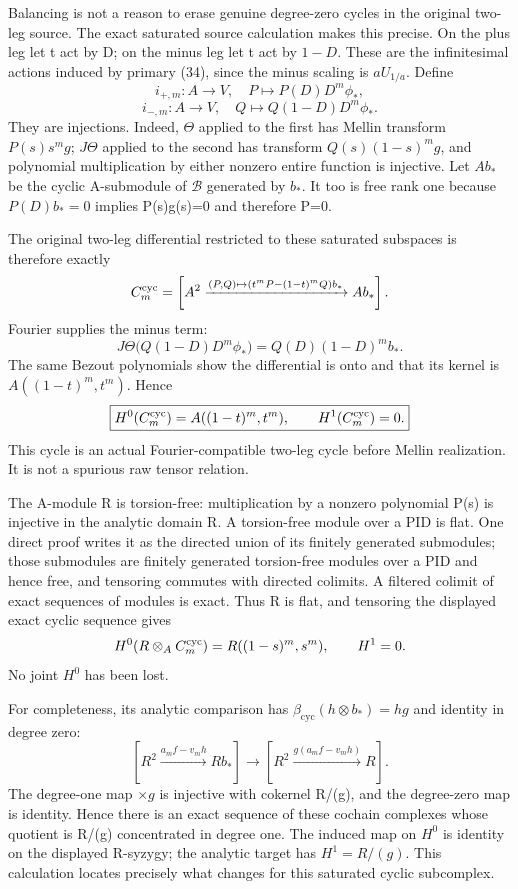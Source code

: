 \documentclass[10pt,a4paper,oneside]{report}
\begin{document}
Balancing is not a reason to erase genuine degree-zero cycles in the original two-leg source. The exact saturated source calculation makes this precise. On the plus leg let t act by D; on the minus leg let t act by \(1-D\). These are the infinitesimal actions induced by primary (34), since the minus scaling is \(aU_{1/a}\). Define \[
i_{+,m}:A\longrightarrow V,\quad
P\longmapsto P(D)D^m\phi_*,
\] \[
i_{-,m}:A\longrightarrow V,\quad
Q\longmapsto Q(1-D)D^m\phi_*.
\] They are injections. Indeed, \(\Theta\) applied to the first has Mellin transform \(P(s)s^mg\); \(J\Theta\) applied to the second has transform \(Q(s)(1-s)^mg\), and polynomial multiplication by either nonzero entire function is injective. Let \(A b_*\) be the cyclic A-submodule of \(\mathscr B\) generated by \(b_*\). It too is free rank one because \(P(D)b_*=0\) implies P(s)g(s)=0 and therefore P=0.

The original two-leg differential restricted to these saturated subspaces is therefore exactly \[
C_m^{\rm cyc}
=\left[A^2\xrightarrow{(P,Q)\mapsto
(t^mP-(1-t)^mQ)b_*}A b_*\right].
\] Fourier supplies the minus term: \[
J\Theta\bigl(Q(1-D)D^m\phi_*\bigr)
=Q(D)(1-D)^m b_*.
\] The same Bezout polynomials show the differential is onto and that its kernel is \(A((1-t)^m,t^m)\). Hence \[
\boxed{H^0(C_m^{\rm cyc})=A((1-t)^m,t^m),\qquad
H^1(C_m^{\rm cyc})=0.}
\] This cycle is an actual Fourier-compatible two-leg cycle before Mellin realization. It is not a spurious raw tensor relation.

The A-module R is torsion-free: multiplication by a nonzero polynomial P(s) is injective in the analytic domain R. A torsion-free module over a PID is flat. One direct proof writes it as the directed union of its finitely generated submodules; those submodules are finitely generated torsion-free modules over a PID and hence free, and tensoring commutes with directed colimits. A filtered colimit of exact sequences of modules is exact. Thus R is flat, and tensoring the displayed exact cyclic sequence gives \[
H^0(R\otimes_A C_m^{\rm cyc})
=R((1-s)^m,s^m),\qquad H^1=0.
\] No joint \(H^0\) has been lost.

For completeness, its analytic comparison has \(\beta_{\mathrm{cyc}}(h\otimes b_*)=hg\) and identity in degree zero: \[
[R^2\xrightarrow{a_m f-v_mh}R b_*]
\longrightarrow
[R^2\xrightarrow{g(a_m f-v_mh)}R].
\] The degree-one map \(\times g\) is injective with cokernel R/(g), and the degree-zero map is identity. Hence there is an exact sequence of these cochain complexes whose quotient is R/(g) concentrated in degree one. The induced map on \(H^0\) is identity on the displayed R-syzygy; the analytic target has \(H^1=R/(g)\). This calculation locates precisely what changes for this saturated cyclic subcomplex.
\end{document}
